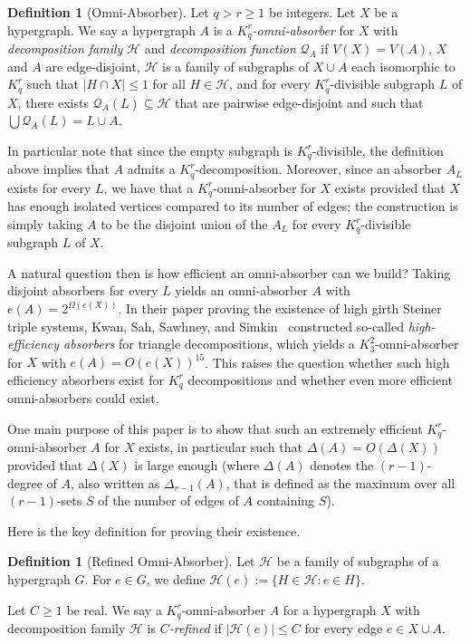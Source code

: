 \documentclass[11pt]{article}
\newcounter{i}
\theoremstyle{plain}
\theoremstyle{plain} %
\theoremstyle{definition}
\newtheorem{definition}[thm]{Definition}
\begin{document}
\begin{definition}[Omni-Absorber]
Let $q > r\ge 1$ be integers. Let $X$ be a hypergraph. We say a hypergraph $A$ is a \emph{$K_q^r$-omni-absorber} for $X$ with \emph{decomposition family} $\mathcal{H}$ and \emph{decomposition function} $\mathcal{Q}_A$ if $V(X)=V(A)$, $X$ and $A$ are edge-disjoint, $\mathcal{H}$ is a family of subgraphs of $X\cup A$ each isomorphic to $K_q^r$ such that $|H\cap X|\le 1$ for all $H\in\mathcal{H}$, and for every $K_q^r$-divisible subgraph $L$ of $X$, there exists $\mathcal{Q}_A(L)\subseteq \mathcal{H}$ that are pairwise edge-disjoint and such that $\bigcup \mathcal{Q}_A(L)=L\cup A$. 
\end{definition}

In particular note that since the empty subgraph is $K_q^r$-divisible, the definition above implies that $A$ admits a $K_q^r$-decomposition. Moreover, since an absorber $A_L$ exists for every $L$, we have that a $K_q^r$-omni-absorber for $X$ exists provided that $X$ has enough isolated vertices compared to its number of edges; the construction is simply taking $A$ to be the disjoint union of the $A_L$ for every $K_q^r$-divisible subgraph $L$ of $X$.

A natural question then is how efficient an omni-absorber can we build? Taking disjoint absorbers for every $L$ yields an omni-absorber $A$ with $e(A) = 2^{\Omega(e(X))}$. In their paper proving the existence of high girth Steiner triple systems, Kwan, Sah, Sawhney, and Simkin~\cite{KSSS22} constructed so-called \emph{high-efficiency absorbers} for triangle decompositions, which yields a $K_3^2$-omni-absorber for $X$ with $e(A) = O(e(X))^{15}$. This raises the question whether such high efficiency absorbers exist for $K_q^r$ decompositions and whether even more efficient omni-absorbers could exist. 

One main purpose of this paper is to show that such an extremely efficient $K_q^r$-omni-absorber $A$ for $X$ exists, in particular such that $\Delta(A)=O(\Delta(X))$ provided that $\Delta(X)$ is large enough (where $\Delta(A)$ denotes the $(r-1)$-degree of $A$, also written as $\Delta_{r-1}(A)$, that is defined as the maximum over all $(r-1)$-sets $S$ of the number of edges of $A$ containing $S$). 

Here is the key definition for proving their existence.

\begin{definition}[Refined Omni-Absorber]
Let $\mathcal{H}$ be a family of subgraphs of a hypergraph $G$. For $e\in G$, we define $\mathcal{H}(e):= \{H\in \mathcal{H}: e\in H\}$. 

Let $C\ge 1$ be real. We say a $K_q^r$-omni-absorber $A$ for a hypergraph $X$ with decomposition family $\mathcal{H}$ is \emph{$C$-refined} if $|\mathcal{H}(e)|\le C$ for every edge $e\in X\cup A$.
\end{definition}
\end{document}
